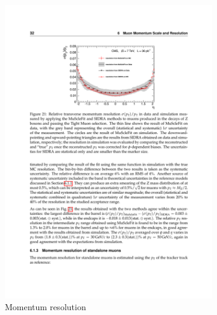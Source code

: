     \begin{figure}[!htb]
      \centering
      \begin{subfigure}[t]{0.48\textwidth}
        \includegraphics[width=\textwidth]{figures/muon_E_resolution.pdf}
        \caption{Momentum resolution}
        \label{fig:muon_E_resolution}
      \end{subfigure}
      \quad
      \begin{subfigure}[t]{0.48\textwidth}

\end{subfigure}
\end{figure}
